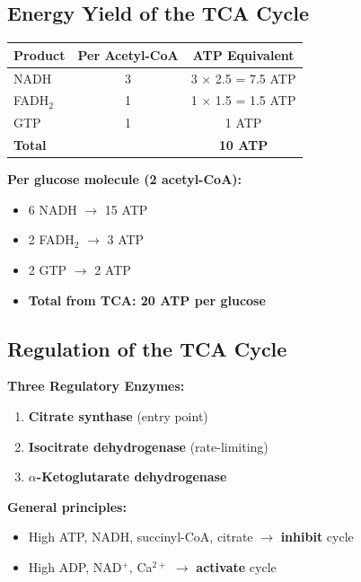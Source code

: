 \subsection{Energy Yield of the TCA Cycle}

\begin{center}
\begin{tabular}{lcc}
\toprule
\textbf{Product} & \textbf{Per Acetyl-CoA} & \textbf{ATP Equivalent} \\
\midrule
NADH & 3 & 3 $\times$ 2.5 = 7.5 ATP \\
FADH$_2$ & 1 & 1 $\times$ 1.5 = 1.5 ATP \\
GTP & 1 & 1 ATP \\
\midrule
\textbf{Total} & & \textbf{10 ATP} \\
\bottomrule
\end{tabular}
\end{center}

\textbf{Per glucose molecule (2 acetyl-CoA):}
\begin{itemize}
    \item 6 NADH $\rightarrow$ 15 ATP
    \item 2 FADH$_2$ $\rightarrow$ 3 ATP
    \item 2 GTP $\rightarrow$ 2 ATP
    \item \textbf{Total from TCA: 20 ATP per glucose}
\end{itemize}

\subsection{Regulation of the TCA Cycle}

\begin{theorem}
\textbf{Three Regulatory Enzymes:}

\begin{enumerate}
    \item \textbf{Citrate synthase} (entry point)
    \item \textbf{Isocitrate dehydrogenase} (rate-limiting)
    \item \textbf{$\alpha$-Ketoglutarate dehydrogenase}
\end{enumerate}

\textbf{General
principles:}
\begin{itemize}
    \item High ATP, NADH, succinyl-CoA, citrate $\rightarrow$ \textbf{inhibit} cycle
    \item High ADP, NAD$^+$, Ca$^{2+}$ $\rightarrow$ \textbf{activate} cycle
\end{itemize}
\end{theorem}

